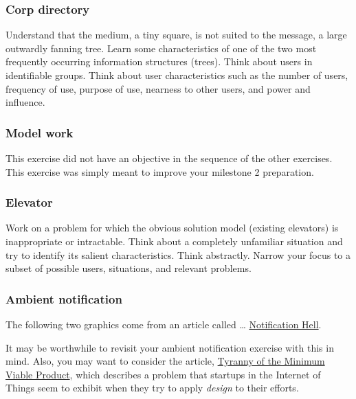 \hypertarget{corp-directory}{%
\subsubsection{Corp directory}\label{corp-directory}}

Understand that the medium, a tiny square, is not suited to the message,
a large outwardly fanning tree. Learn some characteristics of one of the
two most frequently occurring information structures (trees). Think
about users in identifiable groups. Think about user characteristics
such as the number of users, frequency of use, purpose of use, nearness
to other users, and power and influence.

\hypertarget{model-work}{%
\subsubsection{Model work}\label{model-work}}

This exercise did not have an objective in the sequence of the other
exercises. This exercise was simply meant to improve your milestone 2
preparation.

\hypertarget{elevator}{%
\subsubsection{Elevator}\label{elevator}}

Work on a problem for which the obvious solution model (existing
elevators) is inappropriate or intractable. Think about a completely
unfamiliar situation and try to identify its salient characteristics.
Think abstractly. Narrow your focus to a subset of possible users,
situations, and relevant problems.

\hypertarget{ambient-notification-1}{%
\subsubsection{Ambient notification}\label{ambient-notification-1}}

The following two graphics come from an article called \ldots{}
\href{http://www.theverge.com/2015/3/26/8292213/olio-smartwatch-hands-on}{Notification
Hell}.

It may be worthwhile to revisit your ambient notification exercise with
this in mind. Also, you may want to consider the article,
\href{https://medium.com/@jonhpittman/the-tyranny-of-the-minimum-viable-product-fb25e2e57e6e}{Tyranny
of the Minimum Viable Product}, which describes a problem that startups
in the Internet of Things seem to exhibit when they try to apply
\emph{design} to their efforts.

